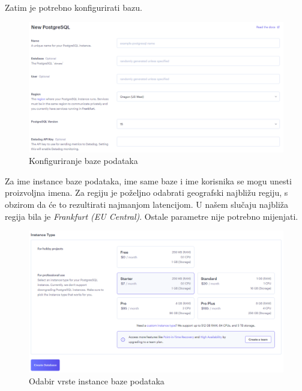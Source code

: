 			Zatim je potrebno konfigurirati bazu.
			
			\begin{figure}[H]
				\includegraphics[width=\textwidth]{slike/upute/konfiguriranjeBaze.png} %
				\caption{Konfiguriranje baze podataka}
				\label{fig:konfiguriranjeBaze} %
			\end{figure}
			
			Za ime instance baze podataka, ime same baze i ime korisnika se mogu unesti proizvoljna imena. Za regiju je poželjno odabrati geografski najbližu regiju, s obzirom da će to rezultirati najmanjom latencijom. U našem slučaju najbliža regija bila je \textit{Frankfurt (EU Central)}. Ostale parametre nije potrebno mijenjati.
			
			\begin{figure}[H]
				\includegraphics[width=\textwidth]{slike/upute/bazaPlacanje.png} %
				\caption{Odabir vrste instance baze podataka}
				\label{fig:bazaPlacanje} %
			\end{figure}
			
